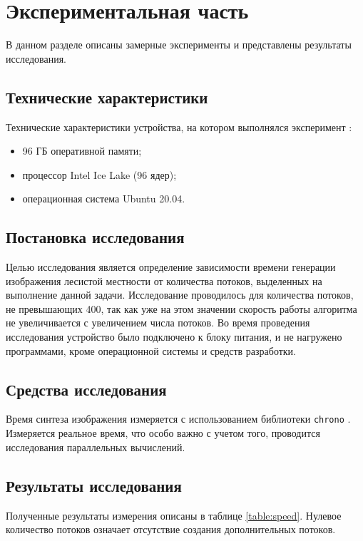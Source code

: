 \chapter{Экспериментальная часть}

В данном разделе описаны замерные эксперименты и представлены результаты исследования.

\section{Технические характеристики}
Технические характеристики устройства, на котором выполнялся эксперимент \cite{bib:yandex}:
\begin{itemize}
	\item 96 ГБ оперативной памяти;
	\item процессор Intel Ice Lake (96 ядер);
    \item операционная система Ubuntu 20.04.
\end{itemize}

\section{Постановка исследования}
Целью исследования является определение зависимости времени генерации изображения лесистой местности от количества потоков, выделенных на выполнение данной задачи. Исследование проводилось для количества потоков, не превышающих 400, так как уже на этом значении скорость работы алгоритма не увеличивается с увеличением числа потоков. Во время проведения исследования устройство было подключено к блоку питания, и не нагружено программами, кроме операционной системы и средств разработки. 

\section{Средства исследования}
Время синтеза изображения измеряется с использованием библиотеки \texttt{chrono} \cite{bib:chrono}. Измеряется реальное время, что особо важно с учетом того, проводится исследования параллельных вычислений.

\section{Результаты исследования}
Полученные результаты измерения описаны в таблице \ref{table:speed}. Нулевое количество потоков означает отсутствие создания дополнительных потоков.
\newpage

